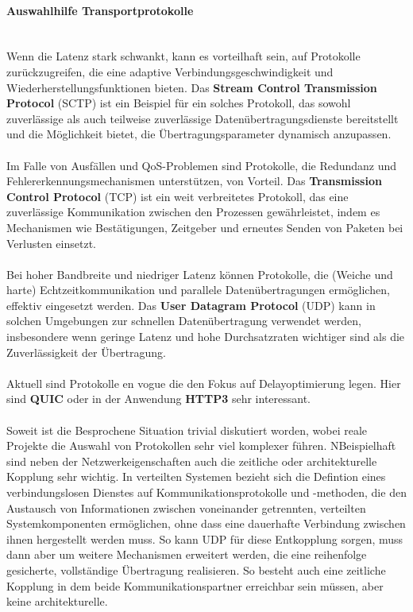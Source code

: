 \paragraph{Auswahlhilfe Transportprotokolle \\\\}
Wenn die Latenz stark schwankt, kann es vorteilhaft sein, auf Protokolle zurückzugreifen, die eine adaptive Verbindungsgeschwindigkeit und Wiederherstellungsfunktionen bieten. Das \textbf{Stream Control Transmission Protocol} (SCTP) ist ein Beispiel für ein solches Protokoll, das sowohl zuverlässige als auch teilweise zuverlässige Datenübertragungsdienste bereitstellt und die Möglichkeit bietet, die Übertragungsparameter dynamisch anzupassen.
\\\\
Im Falle von Ausfällen und QoS-Problemen sind Protokolle, die Redundanz und Fehlererkennungsmechanismen unterstützen, von Vorteil. Das \textbf{Transmission Control Protocol} (TCP) ist ein weit verbreitetes Protokoll, das eine zuverlässige Kommunikation zwischen den Prozessen gewährleistet, indem es Mechanismen wie Bestätigungen, Zeitgeber und erneutes Senden von Paketen bei Verlusten einsetzt.
\\\\
Bei hoher Bandbreite und niedriger Latenz können Protokolle, die (Weiche und harte) Echtzeitkommunikation und parallele Datenübertragungen ermöglichen, effektiv eingesetzt werden. Das \textbf{User Datagram Protocol} (UDP) kann in solchen Umgebungen zur schnellen Datenübertragung verwendet werden, insbesondere wenn geringe Latenz und hohe Durchsatzraten wichtiger sind als die Zuverlässigkeit der Übertragung.
\\\\
Aktuell sind Protokolle en vogue die den Fokus auf Delayoptimierung legen. Hier sind \textbf{QUIC} oder in der Anwendung \textbf{HTTP3} sehr interessant. 
\\\\
Soweit ist die Besprochene Situation trivial diskutiert worden, wobei  reale Projekte die Auswahl von Protokollen sehr viel komplexer führen.  NBeispielhaft sind neben der Netzwerkeigenschaften auch die zeitliche oder architekturelle Kopplung sehr wichtig. 
In verteilten Systemen bezieht sich die Defintion eines verbindungslosen Dienstes auf Kommunikationsprotokolle und -methoden, die den Austausch von Informationen zwischen voneinander getrennten, verteilten Systemkomponenten ermöglichen, ohne dass eine dauerhafte Verbindung zwischen ihnen hergestellt werden muss. So kann UDP für diese Entkopplung sorgen, muss dann aber um weitere Mechanismen erweitert werden, die eine reihenfolge gesicherte, vollständige Übertragung realisieren. So besteht auch eine zeitliche Kopplung in dem beide Kommunikationspartner erreichbar sein müssen, aber keine architekturelle. 

